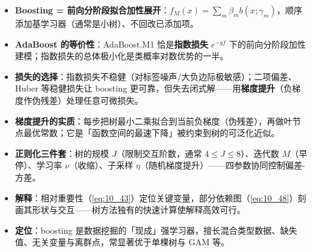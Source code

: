 \begin{itemize}
    \item \textbf{Boosting = 前向分阶段拟合加性展开}：$f_M(x) = \sum_m \beta_m b(x;\gamma_m)$，顺序添加基学习器（通常是小树）、不回改已添加项。
    \item \textbf{AdaBoost 的等价性}：AdaBoost.M1 恰是\textbf{指数损失} $e^{-yf}$ 下的前向分阶段加性建模；指数损失的总体极小化是类概率对数优势的一半。
    \item \textbf{损失的选择}：指数损失不稳健（对标签噪声/大负边际极敏感）；二项偏差、Huber 等稳健损失让 boosting 更可靠，但失去闭式解——用\textbf{梯度提升}（负梯度作伪残差）处理任意可微损失。
    \item \textbf{梯度提升的实质}：每步把树最小二乘拟合到当前负梯度（伪残差），再做叶节点最优常数；它是「函数空间的最速下降」被约束到树的可泛化近似。
    \item \textbf{正则化三件套}：树的规模 $J$（限制交互阶数，通常 $4\le J\le 8$）、迭代数 $M$（早停）、学习率 $\nu$（收缩）、子采样 $\eta$（随机梯度提升）——四参数协同控制偏差-方差。
    \item \textbf{解释}：相对重要性（\eqref{eq:10_43}）定位关键变量，部分依赖图（\eqref{eq:10_48}）刻画其形状与交互——树方法独有的快速计算使解释高效可行。
    \item \textbf{定位}：boosting 是数据挖掘的「现成」强学习器，擅长混合类型数据、缺失值、无关变量与离群点，常显著优于单棵树与 GAM 等。
\end{itemize}

